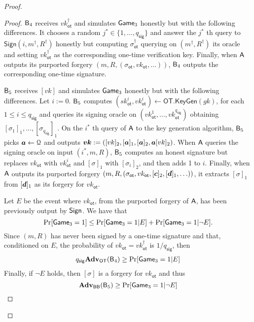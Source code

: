\begin{proof}
\begin{proof}
$\mathsf{B}_4$ receives $vk_\mathsf{ot}^\dag$ and simulates $\mathsf{Game}_3$ honestly but with the following differences. It chooses a random $j^*\in\{1,\ldots, q_\mathsf{sig}\}$ and answer the $j^*$ th query to $\mathsf{Sign}(i,m^\dag,R^\dag)$ honestly but computing $\sigma_\mathsf{ot}^\dag$ querying on $(m^\dag,R^\dag)$ its oracle and setting $vk_\mathsf{ot}^\dag$ as the corresponding one-time verification key. Finally, when $\mathsf{A}$ outputs its purported forgery $(m,R,(\sigma_\mathsf{ot},vk_\mathsf{ot},\ldots))$, $\mathsf{B}_4$ outputs the corresponding one-time signature.

$\mathsf{B}_5$ receives $[vk]$ and simulates $\mathsf{Game}_3$ honestly but with the following differences. Let $i:=0$. $\mathsf{B}_5$ computes $(sk_\mathsf{ot}^i,vk_\mathsf{ot}^i)\gets\mathsf{OT}.\mathsf{KeyGen}(gk)$, for each $1\leq i\leq q_\mathsf{sig}$ and queries its signing oracle on $(vk_{\mathsf{ot}}^1,\ldots,vk_\mathsf{ot}^{q_{\mathsf{sig}}})$ obtaining $[\sigma_1]_1,\ldots,[\sigma_{q_\mathsf{sig}}]_1$. On the $i^*$ th query of $\mathsf{A}$ to the key generation algorithm, $\mathsf{B}_5$ picks ${\boldsymbol{a}}\gets\mathcal{Q}$ and outputs ${\boldsymbol{vk}}:=([vk]_2,[{\boldsymbol{a}}]_1,[{\boldsymbol{a}}]_2,{\boldsymbol{a}}[vk]_2)$. When $\mathsf{A}$ queries the signing oracle on input $(i^*,m,R)$, $\mathsf{B}_5$ computes an honest signature but replaces $vk_\mathsf{ot}$ with $vk_\mathsf{ot}^i$ and $[\sigma]_1$ with $[\sigma_i]_2$, and then adds 1 to $i$. Finally, when $\mathsf{A}$ outputs its purported forgery $(m,R,(\sigma_\mathsf{ot},vk_\mathsf{ot},[{\boldsymbol{c}}]_2,[{\boldsymbol{d}}]_1,\ldots))$, it extracts $[\sigma]_1$ from $[{\boldsymbol{d}}]_1$ as its forgery for $vk_\mathsf{ot}$.

Let $E$ be the event where $vk_\mathsf{ot}$, from the purported forgery of $\mathsf{A}$, has been previously output by $\mathsf{Sign}$. We have that
$$
\Pr[\mathsf{Game}_3=1]\leq \Pr[\mathsf{Game}_3=1|E]+\Pr[\mathsf{Game}_3=1|\neg E].
$$
Since  $(m,R)$ has never been signed by a one-time signature and that, conditioned on $E$, the probability of $vk_\mathsf{ot}=vk_\mathsf{ot}^\dag$ is $1/q_\mathsf{sig}$, then
\begin{align*}
q_{\mathsf{sig}}\mathbf{Adv}_\mathsf{OT}(\mathsf{B}_4)\geq  \Pr[\mathsf{Game}_3=1|E]
\end{align*}
Finally, if $\neg E$ holds, then $[\sigma]$ is a forgery for $vk_\mathsf{ot}$ and thus
$$
\mathbf{Adv}_{\mathsf{BB}}(\mathsf{B}_5)\geq \Pr[\mathsf{Game}_3=1|\neg E]$$
\end{proof}
\end{proof}

